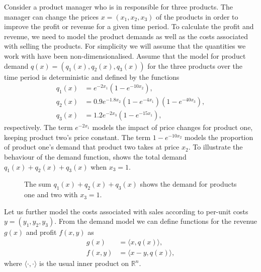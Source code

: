 \documentclass[main.tex]{subfiles}
\begin{document}
Consider a product manager who is in responsible for three products.
The manager can change the prices
$x=(x_1,x_2,x_3)$
of the products in order to improve the profit or revenue for a given
time period.
To calculate the profit and revenue, we need to model the product
demands as well as the costs associated with selling the products.
For simplicity we will assume that the quantities we work with have
been non-dimensionalised.
Assume that the model for product demand $q(x)=(q_1(x),q_2(x),q_3(x))$
for the three products over the time period is
deterministic and defined by the functions
\begin{align}
  q_1(x) &= e^{-2x_1}(1-e^{-10x_2}),\\
  q_2(x) &= 0.9e^{-1.8x_2}(1-e^{-4x_1})(1-e^{-40x_3}),\\
  q_3(x) &= 1.2e^{-2x_3}(1-e^{-15x_1}),
\end{align}
respectively.
The term $e^{-2x_1}$  models the impact of price
changes for product one, keeping product two's price constant.
The term $1-e^{-10x_2}$ models the proportion of product one's
demand that product two takes at price $x_2$.
To illustrate the behaviour of the demand function,
 shows the total demand $q_1(x)+q_2(x)+q_3(x)$ when
$x_3=1$.
\begin{figure}[htbp]
  \centering
  \caption[Demand for three products.]{The sum $q_1(x)+q_2(x)+q_3(x)$ shows the demand for products one
    and two with $x_3=1$.
  }\label{fig:total_volume_2d}
\end{figure}

Let us further model the costs associated with sales according to per-unit
costs $y=(y_1,y_2,y_3)$.
From the demand model we can define functions for the revenue $g(x)$ and profit
$f(x,y)$ as
\begin{align}
  g(x)&=\langle x,q(x) \rangle,\\
  f(x,y)
      &=\langle x-y,q(x) \rangle,
\end{align}
where $\langle \cdot,\cdot \rangle$ is the usual inner product on
$\mathbb{R}^n$.
\end{document}
